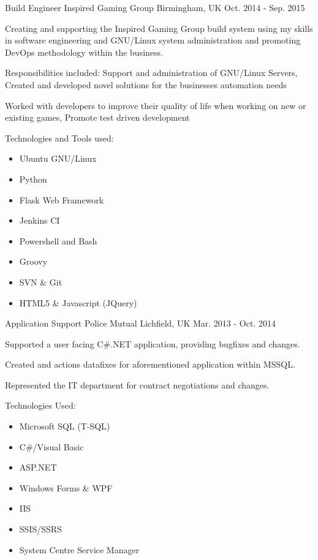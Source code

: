\begin{cventries}
  \cventry
    {Build Engineer} %
    {Inspired Gaming Group} %
    {Birmingham, UK} %
    {Oct. 2014 - Sep. 2015} %
    {
	    \begin{cvitems} %
	    \item {Creating and supporting the Inspired Gaming Group build system using my skills in software engineering and GNU/Linux system administration and promoting DevOps methodology within the business.}
	    \item {Responsibilities included: Support and administration of GNU/Linux Servers, Created and developed novel solutions for the businesses automation needs}
	    \item{Worked with developers to improve their quality of life when working on new or existing games, Promote test driven development}
	    \item{Technologies and Tools used:}
		    \begin{itemize}
			    \item{Ubuntu GNU/Linux}
			    \item{Python}
			    \item{Flask Web Framework}
			    \item{Jenkins CI}
			    \item{Powershell and Bash}
			    \item{Groovy}
			    \item{SVN \& Git}
			    \item{HTML5 \& Javascript (JQuery)}
		    \end{itemize}
	    \end{cvitems}
    }

  \cventry
    {Application Support} %
    {Police Mutual} %
    {Lichfield, UK} %
    {Mar. 2013 - Oct. 2014} %
    {
	    \begin{cvitems} %
	    \item {Supported a user facing C\#.NET application, providing bugfixes and changes.}
	    \item {Created and actions datafixes for aforementioned application within MSSQL.}
	    \item {Represented the IT department for contract negotiations and changes.}
	    \item {Technologies Used:}
		    \begin{itemize}
			    \item{Microsoft SQL (T-SQL)}
			    \item{C\#/Visual Basic}
			    \item{ASP.NET}
			    \item{Windows Forms \& WPF}
			    \item{IIS}
			    \item{SSIS/SSRS}
			    \item{System Centre Service Manager}
		    \end{itemize}
	    \end{cvitems}
    }


\end{cventries}
